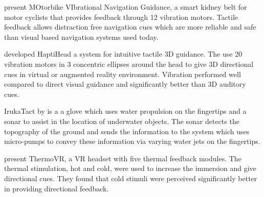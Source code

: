 \cite{Kiss:2018:NSM:3173574.3174191} present MOtorbike VIbrational Navigation Guidance, a smart kidney belt for motor cyclists that provides feedback through 12 vibration motors.
Tactile feedback allows distraction free navigation cues which are more reliable and safe than visual based navigation systems used today.

\cite{Kaul_HapticHead} developed HaptiHead a system for intuitive tactile 3D guidance.
The use 20 vibration motors in 3 concentric ellipses around the head to give 3D directional cues in virtual or augmented reality environment.
Vibration performed well compared to direct visual guidance and significantly better than 3D auditory cues.

IrukaTact by \cite{Chacin_Irukatact} is a a glove which uses water propulsion on the fingertips and a sonar to assist in the location of underwater objects. The sonar detects the topography of the ground and sends the information to the system which uses micro-pumps to convey these information via varying water jets on the fingertips.

\cite{Peiris_thermoVR} present ThermoVR, a VR headset with five thermal feedback modules. 
The thermal stimulation, hot and cold, were used to increase the immersion and give directional cues.
They found that cold stimuli were perceived significantly better in providing directional feedback.

\cite{Wilson:2011:LHT:1978942.1979316} 










































